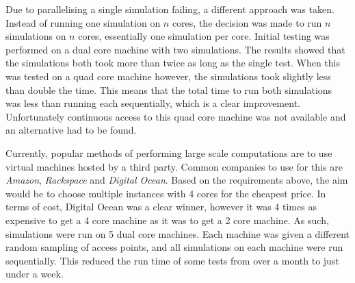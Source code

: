        Due to parallelising a single simulation failing, a different approach was taken. Instead of running one simulation on $n$ cores, the decision was made to run $n$ simulations on $n$ cores, essentially one simulation per core. Initial testing was performed on a dual core machine with two simulations. The results showed that the simulations both took more than twice as long as the single test. When this was tested on a quad core machine however, the simulations took slightly less than double the time. This means that the total time to run both simulations was less than running each sequentially, which is a clear improvement. Unfortunately continuous access to this quad core machine was not available and an alternative had to be found. 

        Currently, popular methods of performing large scale computations are to use virtual machines hosted by a third party. Common companies to use for this are \emph{Amazon}, \emph{Rackspace} and \emph{Digital Ocean}. Based on the requirements above, the aim would be to choose multiple instances with 4 cores for the cheapest price. In terms of cost, Digital Ocean was a clear winner, however it was 4 times as expensive to get a 4 core machine as it was to get a 2 core machine. As such, simulations were run on 5 dual core machines. Each machine was given a different random sampling of access points, and all simulations on each machine were run sequentially. This reduced the run time of some tests from over a month to just under a week. 



